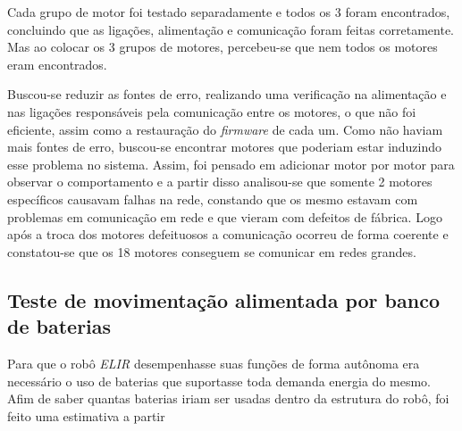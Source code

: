 Cada grupo de motor foi testado separadamente e todos os 3 foram encontrados, concluindo que as ligações, alimentação e comunicação foram feitas corretamente. Mas ao colocar os 3 grupos de motores, percebeu-se que nem todos os motores eram encontrados.

Buscou-se reduzir as fontes de erro, realizando uma verificação na alimentação e nas ligações responsáveis pela comunicação entre os motores, o que não foi eficiente, assim como a restauração do \textit{firmware} de cada um. Como não haviam mais fontes de erro, buscou-se encontrar motores que poderiam estar induzindo esse problema no sistema. Assim, foi pensado em adicionar motor por motor para observar o comportamento e a partir disso analisou-se que somente 2 motores específicos causavam falhas na rede, constando que os mesmo estavam com problemas em comunicação em rede e que vieram com defeitos de fábrica. Logo após a troca dos motores defeituosos a comunicação ocorreu de forma coerente e constatou-se que os 18 motores conseguem se comunicar em redes grandes.

\subsection{Teste de movimentação alimentada por banco de baterias}\label{sec:test_bate}
Para que o robô \textit{ELIR} desempenhasse suas funções de forma autônoma era necessário o uso de baterias que suportasse toda demanda energia do mesmo. Afim de saber quantas baterias iriam ser usadas dentro da estrutura do robô, foi feito uma estimativa a partir 

